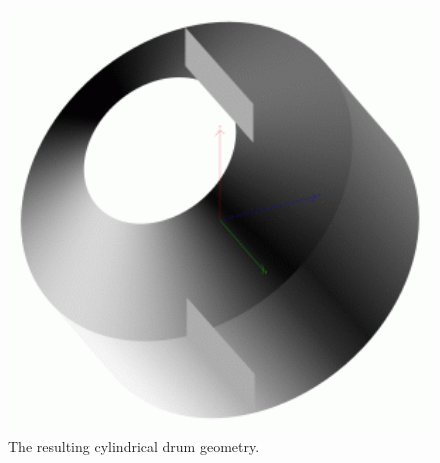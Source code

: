 \begin{figure}
 \centering
 \includegraphics[width=5in]{pics/drum.png}   
 \caption[The resulting cylindrical drum geometry]{The resulting cylindrical drum geometry.}
 \label{fig:drumpic}
\end{figure}